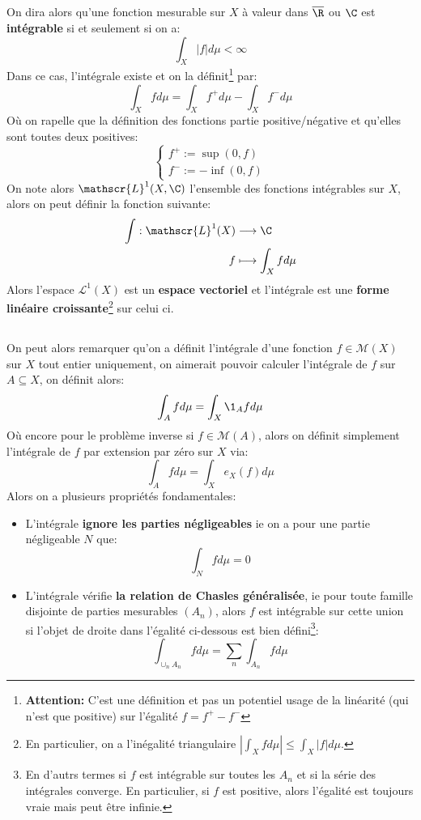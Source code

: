 \subsection*{}
On dira alors qu'une fonction mesurable sur \(X\) à valeur dans \(\overline{\R}\) ou \(\C\) est \textbf{intégrable} si et seulement si on a:
\[
   \int_{X} |f|d\mu < \infty
\]
Dans ce cas, l'intégrale existe et on la définit\footnote[1]{\textbf{Attention:} C'est une définition et pas un potentiel usage de la linéarité (qui n'est que positive) sur l'égalité \(f = f^+ - f^-\)} par:
\[
   \int_{X} f d\mu = \int_{X} f^+ d\mu - \int_{X} f^- d\mu
\]
Où on rapelle que la définition des fonctions partie positive/négative et qu'elles sont toutes deux positives:
\[
   \begin{cases}
      f^+ := \sup(0, f)\\
      f^- := -\inf(0, f)
   \end{cases}
\]
On note alors \(\mathscr{L}^1(X, \C)\) l'ensemble des fonctions intégrables sur \(X\), alors on peut définir la fonction suivante:
\[
   \begin{aligned}
      \int : \mathscr{L}^1(X) &\longrightarrow \C\\
      f &\longmapsto \int_{X} fd\mu
   \end{aligned}
\]
Alors l'espace \(\mathscr{L}^1(X)\) est un \textbf{espace vectoriel} et l'intégrale est une \textbf{forme linéaire croissante}\footnote[2]{En particulier, on a l'inégalité triangulaire \(\left|\int_{X} fd\mu \right| \leq \int_{X} |f|d\mu\).} sur celui ci.
\subsection*{}
On peut alors remarquer qu'on a définit l'intégrale d'une fonction \(f \in \mathscr{M}(X)\) sur \(X\) tout entier uniquement, on aimerait pouvoir calculer l'intégrale de \(f\) sur \(A \subseteq X\), on définit alors:
\[
   \int_A f d\mu = \int_X \1_Afd\mu
\]
Où encore pour le problème inverse si \(f \in \mathscr{M}(A)\), alors on définit simplement l'intégrale de \(f\) par extension par zéro sur \(X\) via:
\[
   \int_A f d\mu = \int_X e_X(f)d\mu
\]
Alors on a plusieurs propriétés fondamentales:
\begin{itemize}

   \item L'intégrale \textbf{ignore les parties négligeables} ie on a pour une partie négligeable \(N\) que:
   \[
      \int_{N} fd\mu =0
   \]
   \item L'intégrale vérifie \textbf{la relation de Chasles généralisée}, ie pour toute famille disjointe de parties mesurables \((A_n)\), alors \(f\) est intégrable sur cette union si l'objet de droite dans l'égalité ci-dessous est bien défini\footnote[3]{En d'autrs termes si \(f\) est intégrable sur toutes les \(A_n\) et si la série des intégrales converge. En particulier, si \(f\) est positive, alors l'égalité est toujours vraie mais peut être infinie.}:
   \[
      \int_{\cup_n A_n} fd\mu = \sum_n \int_{A_n} fd\mu 
   \]
\end{itemize}


